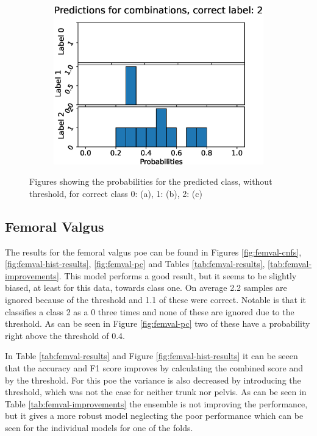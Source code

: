 \begin{figure}
\begin{subfigure}[t]{0.33\textwidth}
    \includegraphics[width=\textwidth]{files/figs/res/pelvis/pc2.eps}
    \caption{}
    \label{fig:pelvis-pc2}
  \end{subfigure}

  \caption{Figures showing the probabilities for the predicted class, without threshold, for correct class 0: (a), 1: (b), 2: (c)}
  \label{fig:pelvis-pc}
\end{figure}


\FloatBarrier
\subsection{Femoral Valgus}

The results for the femoral valgus \gls{poe} can be found in Figures \ref{fig:femval-cnfs}, \ref{fig:femval-hist-results}, \ref{fig:femval-pc} and Tables \ref{tab:femval-results}, \ref{tab:femval-improvements}.
This model performs a good result, but it seems to be slightly biased, at least for this data, towards class one. On average 2.2 samples are ignored because of the threshold and 1.1 of these were correct. Notable is that it classifies a class 2 as a 0 three times and none of these are ignored due to the threshold. As can be seen in Figure \ref{fig:femval-pc} two of these have a probability right above the threshold of 0.4.

In Table \ref{tab:femval-results} and Figure \ref{fig:femval-hist-results} it can be seeen that the accuracy and F1 score improves by calculating the combined score and by the threshold. For this \gls{poe} the variance is also decreased by introducing the threshold, which was not the case for neither trunk nor pelvis. As can be seen in Table \ref{tab:femval-improvements} the ensemble is not improving the performance, but it gives a more robust model neglecting the poor performance which can be seen for the individual models for one of the folds.

